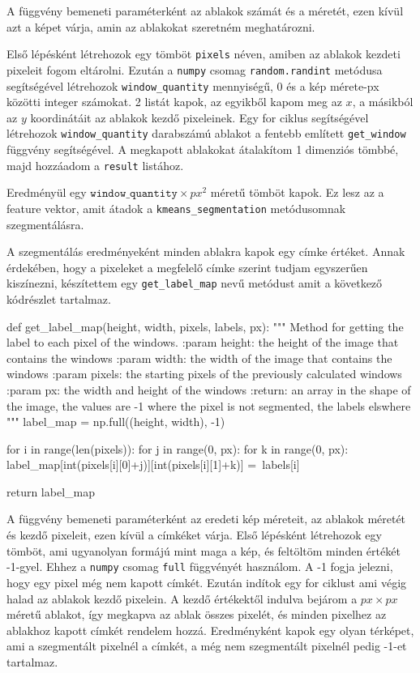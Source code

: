 A függvény bemeneti paraméterként az ablakok számát és a méretét, ezen kívül azt a képet várja, amin az ablakokat szeretném meghatározni.

Első lépésként létrehozok egy tömböt \texttt{pixels} néven, amiben az ablakok kezdeti pixeleit fogom eltárolni. Ezután a \texttt{numpy} csomag \texttt{random.randint} metódusa segítségével létrehozok \texttt{window\_quantity} mennyiségű, 0 és a kép mérete-px közötti integer számokat. 2 listát kapok, az egyikből kapom meg az $x$, a másikból az $y$ koordinátáit az ablakok kezdő pixeleinek. Egy for ciklus segítségével létrehozok \texttt{window\_quantity} darabszámú ablakot a fentebb említett \texttt{get\_window} függvény segítségével. A megkapott ablakokat átalakítom 1 dimenziós tömbbé, majd hozzáadom a \texttt{result} listához.

Eredményül egy $\texttt{window\_quantity} \times px^2$ méretű tömböt kapok. Ez lesz az a feature vektor, amit átadok a \texttt{kmeans\_segmentation} metódusomnak szegmentálásra.

A szegmentálás eredményeként minden ablakra kapok egy címke értéket. Annak érdekében, hogy a pixeleket a megfelelő címke szerint tudjam egyszerűen kiszínezni, készítettem egy \texttt{get\_label\_map} nevű metódust amit a következő kódrészlet tartalmaz.

\begin{python}
def get_label_map(height, width, pixels, labels, px):
    """
    Method for getting the label to each pixel of the windows.
    :param height: the height of the image that contains the windows
    :param width: the width of the image that contains the windows
    :param pixels: the starting pixels of the previously
        calculated windows
    :param px: the width and height of the windows
    :return: an array in the shape of the image,
        the values are -1 where the pixel is not segmented,
        the labels elswhere
    """
    label_map = np.full((height, width), -1)

    for i in range(len(pixels)):
        for j in range(0, px):
            for k in range(0, px):
                label_map[int(pixels[i][0]+j)][int(pixels[i][1]+k)] =\
                    labels[i]

    return label_map
\end{python}

A függvény bemeneti paraméterként az eredeti kép méreteit, az ablakok méretét és kezdő pixeleit, ezen kívül a címkéket várja. Első lépésként létrehozok egy tömböt, ami ugyanolyan formájú mint maga a kép, és feltöltöm minden értékét -1-gyel. Ehhez a \texttt{numpy} csomag \texttt{full} függvényét használom. A -1 fogja jelezni, hogy egy pixel még nem kapott címkét. Ezután indítok egy for ciklust ami végig halad az ablakok kezdő pixelein. A kezdő értékektől indulva bejárom a $px \times px$ méretű ablakot, így megkapva az ablak összes pixelét, és minden pixelhez az ablakhoz kapott címkét rendelem hozzá. Eredményként kapok egy olyan térképet, ami a szegmentált pixelnél a címkét, a még nem szegmentált pixelnél pedig -1-et tartalmaz.

